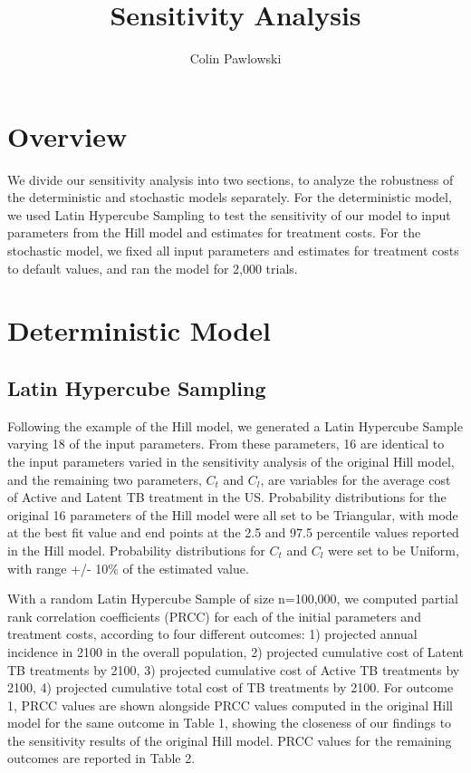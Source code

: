 \documentclass{article}[11pt]
\begin{document}
\title{Sensitivity Analysis}
\author{Colin Pawlowski}
\date{}
\maketitle


\section{Overview}
We divide our sensitivity analysis into two sections, to analyze the robustness of the deterministic and stochastic models separately.  For the deterministic model, we used Latin Hypercube Sampling to test the sensitivity of our model to input parameters from the Hill model and estimates for treatment costs.  
For the stochastic model, we fixed all input parameters and estimates for treatment costs to default values, and ran the model for 2,000 trials.  

\section{Deterministic Model}
\subsection{Latin Hypercube Sampling}
Following the example of the Hill model, we generated a Latin Hypercube Sample varying 18 of the input parameters.  From these parameters, 16 are identical to the input parameters varied in the sensitivity analysis of the original Hill model, and the remaining two parameters, $C_{t}$ and $C_{l}$, are variables for the average cost of Active and Latent TB treatment in the US.  Probability distributions for the original 16 parameters of the Hill model were all set to be Triangular, with mode at the best fit value and end points at the 2.5 and 97.5 percentile values reported in the Hill model.  Probability distributions for $C_{t}$ and $C_{l}$ were set to be Uniform, with range +/- 10\% of the estimated value.  

With a random Latin Hypercube Sample of size n=100,000, we computed partial rank correlation coefficients (PRCC) for each of the initial parameters and treatment costs, according to four different outcomes: 1) projected annual incidence in 2100 in the overall population, 2) projected cumulative cost of Latent TB treatments by 2100, 3) projected cumulative cost of Active TB treatments by 2100, 4) projected cumulative total cost of TB treatments by 2100.  For outcome 1, PRCC values are shown alongside PRCC values computed in the original Hill model for the same outcome in Table 1, showing the closeness of our findings to the sensitivity results of the original Hill model.  PRCC values for the remaining outcomes are reported in Table 2.  
\end{document}
